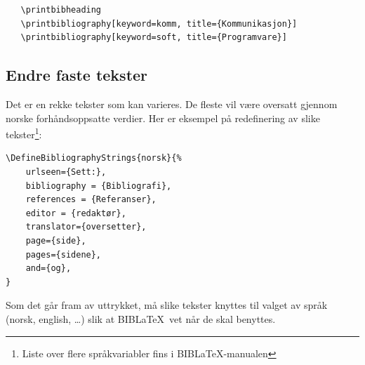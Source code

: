 \documentclass[11pt,norsk,a4paper]{article}
\newcommand{\blt}{B{\smaller[2]IB}\discretionary{-}{}{\kern
    -0.12em}\LaTeX{}}
\begin{document}
{\footnotesize\begin{verbatim}
   \printbibheading
   \printbibliography[keyword=komm, title={Kommunikasjon}]
   \printbibliography[keyword=soft, title={Programvare}]
\end{verbatim}}

\subsection{Endre faste tekster}\label{tekster}
Det er en rekke tekster som kan varieres. De fleste vil være oversatt
gjennom norske forhåndsoppsatte verdier. Her er eksempel på
redefinering av slike tekster\footnote{Liste over flere språkvariabler
  fins i \blt-manualen\cite[][se under avsnitt 4.9, s. 208]{biblatex}}:

{\footnotesize\begin{verbatim}
\DefineBibliographyStrings{norsk}{%
    urlseen={Sett:},
    bibliography = {Bibliografi},
    references = {Referanser},
    editor = {redaktør},
    translator={oversetter},
    page={side},
    pages={sidene},
    and={og},
}
\end{verbatim}}

Som det går fram av uttrykket, må slike tekster knyttes til valget av
språk (norsk, english, \ldots) slik at \blt\ vet når de skal benyttes.
\end{document}
